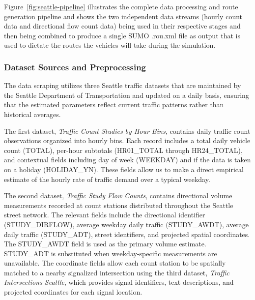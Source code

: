 \documentclass[12pt]{article}
\begin{document}
Figure~\ref{fig:seattle-pipeline} illustrates the complete data processing and route generation pipeline and shows the two independent data streams (hourly count data and directional flow count data) being used in their respective stages and then being combined to produce a single SUMO .rou.xml file as output that is used to dictate the routes the vehicles will take during the simulation.

\subsubsection{Dataset Sources and Preprocessing}

The data scraping utilizes three Seattle traffic datasets that are maintained by the Seattle Department of Transportation and updated on a daily basis, ensuring that the estimated parameters reflect current traffic patterns rather than historical averages.

The first dataset, \emph{Traffic Count Studies by Hour Bins,} contains daily traffic count observations organized into hourly bins. Each record includes a total daily vehicle count (TOTAL), per-hour subtotals (HR01\_TOTAL through HR24\_TOTAL), and contextual fields including day of week (WEEKDAY) and if the data is taken on a holiday (HOLIDAY\_YN). These fields allow us to make a direct empirical estimate of the hourly rate of traffic demand over a typical weekday.

The second dataset, \emph{Traffic Study Flow Counts}, contains directional volume measurements recorded at count stations distributed throughout the Seattle street network. The relevant fields include the directional identifier (STUDY\_DIRFLOW), average weekday daily traffic (STUDY\_AWDT), average daily traffic (STUDY\_ADT), street identifiers, and projected spatial coordinates. The STUDY\_AWDT field is used as the primary volume estimate. STUDY\_ADT is substituted when weekday-specific measurements are unavailable. The coordinate fields allow each count station to be spatially matched to a nearby signalized intersection using the third dataset, \emph{Traffic Intersections Seattle}, which provides signal identifiers, text descriptions, and projected coordinates for each signal location.
\end{document}
